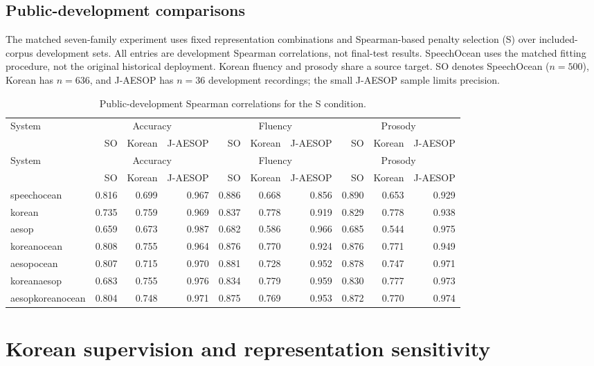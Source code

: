 \documentclass[10pt]{article}
\begin{document}
\begin{landscape}
\section{Public-development comparisons}
The matched seven-family experiment uses fixed representation combinations and Spearman-based penalty selection (S) over included-corpus development sets. All entries are development Spearman correlations, not final-test results. SpeechOcean uses the matched fitting procedure, not the original historical deployment. Korean fluency and prosody share a source target. SO denotes SpeechOcean ($n=500$), Korean has $n=636$, and J-AESOP has $n=36$ development recordings; the small J-AESOP sample limits precision.
\begin{longtable}{@{}lrrrrrrrrr@{}}
\caption{Public-development Spearman correlations for the S condition.}\\
\toprule
System & \multicolumn{3}{c}{Accuracy} & \multicolumn{3}{c}{Fluency} & \multicolumn{3}{c}{Prosody}\\
 & SO & Korean & J-AESOP & SO & Korean & J-AESOP & SO & Korean & J-AESOP\\\midrule
\endfirsthead
\toprule
System & \multicolumn{3}{c}{Accuracy} & \multicolumn{3}{c}{Fluency} & \multicolumn{3}{c}{Prosody}\\
 & SO & Korean & J-AESOP & SO & Korean & J-AESOP & SO & Korean & J-AESOP\\\midrule
\endhead
\bottomrule\endfoot
speechocean & 0.816 & 0.699 & 0.967 & 0.886 & 0.668 & 0.856 & 0.890 & 0.653 & 0.929\\
korean & 0.735 & 0.759 & 0.969 & 0.837 & 0.778 & 0.919 & 0.829 & 0.778 & 0.938\\
aesop & 0.659 & 0.673 & 0.987 & 0.682 & 0.586 & 0.966 & 0.685 & 0.544 & 0.975\\
koreanocean & 0.808 & 0.755 & 0.964 & 0.876 & 0.770 & 0.924 & 0.876 & 0.771 & 0.949\\
aesopocean & 0.807 & 0.715 & 0.970 & 0.881 & 0.728 & 0.952 & 0.878 & 0.747 & 0.971\\
koreanaesop & 0.683 & 0.755 & 0.976 & 0.834 & 0.779 & 0.959 & 0.830 & 0.777 & 0.973\\
aesopkoreanocean & 0.804 & 0.748 & 0.971 & 0.875 & 0.769 & 0.953 & 0.872 & 0.770 & 0.974\\
\end{longtable}
\endgroup
\end{landscape}
\section{Korean supervision and representation sensitivity}
\end{document}
